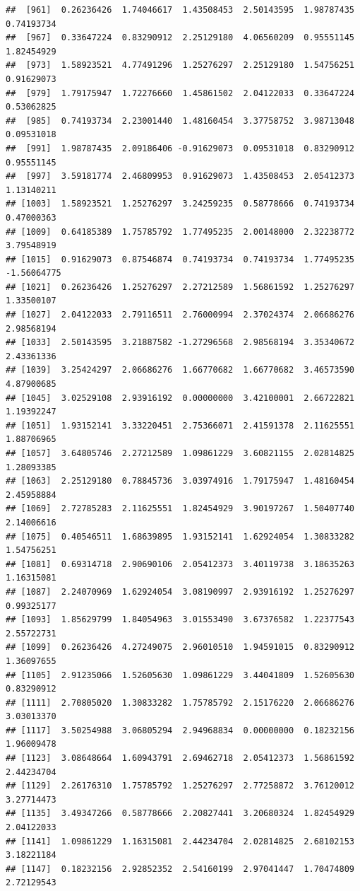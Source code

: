 \documentclass[
]{article}
\begin{document}
\begin{verbatim}
##  [961]  0.26236426  1.74046617  1.43508453  2.50143595  1.98787435  0.74193734
##  [967]  0.33647224  0.83290912  2.25129180  4.06560209  0.95551145  1.82454929
##  [973]  1.58923521  4.77491296  1.25276297  2.25129180  1.54756251  0.91629073
##  [979]  1.79175947  1.72276660  1.45861502  2.04122033  0.33647224  0.53062825
##  [985]  0.74193734  2.23001440  1.48160454  3.37758752  3.98713048  0.09531018
##  [991]  1.98787435  2.09186406 -0.91629073  0.09531018  0.83290912  0.95551145
##  [997]  3.59181774  2.46809953  0.91629073  1.43508453  2.05412373  1.13140211
## [1003]  1.58923521  1.25276297  3.24259235  0.58778666  0.74193734  0.47000363
## [1009]  0.64185389  1.75785792  1.77495235  2.00148000  2.32238772  3.79548919
## [1015]  0.91629073  0.87546874  0.74193734  0.74193734  1.77495235 -1.56064775
## [1021]  0.26236426  1.25276297  2.27212589  1.56861592  1.25276297  1.33500107
## [1027]  2.04122033  2.79116511  2.76000994  2.37024374  2.06686276  2.98568194
## [1033]  2.50143595  3.21887582 -1.27296568  2.98568194  3.35340672  2.43361336
## [1039]  3.25424297  2.06686276  1.66770682  1.66770682  3.46573590  4.87900685
## [1045]  3.02529108  2.93916192  0.00000000  3.42100001  2.66722821  1.19392247
## [1051]  1.93152141  3.33220451  2.75366071  2.41591378  2.11625551  1.88706965
## [1057]  3.64805746  2.27212589  1.09861229  3.60821155  2.02814825  1.28093385
## [1063]  2.25129180  0.78845736  3.03974916  1.79175947  1.48160454  2.45958884
## [1069]  2.72785283  2.11625551  1.82454929  3.90197267  1.50407740  2.14006616
## [1075]  0.40546511  1.68639895  1.93152141  1.62924054  1.30833282  1.54756251
## [1081]  0.69314718  2.90690106  2.05412373  3.40119738  3.18635263  1.16315081
## [1087]  2.24070969  1.62924054  3.08190997  2.93916192  1.25276297  0.99325177
## [1093]  1.85629799  1.84054963  3.01553490  3.67376582  1.22377543  2.55722731
## [1099]  0.26236426  4.27249075  2.96010510  1.94591015  0.83290912  1.36097655
## [1105]  2.91235066  1.52605630  1.09861229  3.44041809  1.52605630  0.83290912
## [1111]  2.70805020  1.30833282  1.75785792  2.15176220  2.06686276  3.03013370
## [1117]  3.50254988  3.06805294  2.94968834  0.00000000  0.18232156  1.96009478
## [1123]  3.08648664  1.60943791  2.69462718  2.05412373  1.56861592  2.44234704
## [1129]  2.26176310  1.75785792  1.25276297  2.77258872  3.76120012  3.27714473
## [1135]  3.49347266  0.58778666  2.20827441  3.20680324  1.82454929  2.04122033
## [1141]  1.09861229  1.16315081  2.44234704  2.02814825  2.68102153  3.18221184
## [1147]  0.18232156  2.92852352  2.54160199  2.97041447  1.70474809  2.72129543

\end{verbatim}
\end{document}
